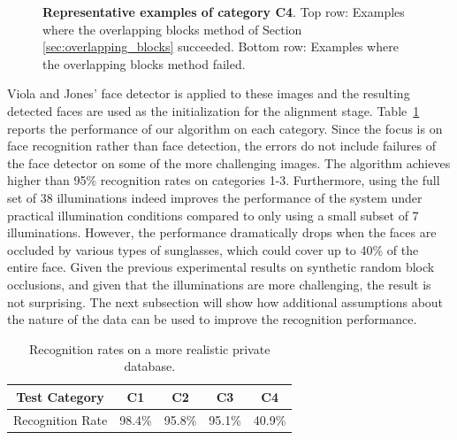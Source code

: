 \begin{figure}
\begin{tabular}{@{}c@{}c@{}c@{}c@{}c@{}c@{}}
\end{tabular}
\caption{\small{\bf Representative examples of category C4}. Top row: Examples
where the overlapping blocks method of Section \ref{sec:overlapping_blocks}
succeeded. Bottom row: Examples where the overlapping blocks method
failed.}
\label{fig:examples4} 
\end{figure}
Viola and Jones' face detector is applied to these images and
the resulting detected faces are used as the 
initialization for the alignment stage.
Table~\ref{tab:UIUC-recognition} reports the performance of our
algorithm on each category.
Since the focus is on face
recognition rather than face detection, 
the errors do not include failures of the face
detector on some of the more challenging images.
The algorithm achieves higher than 95\%
recognition rates on categories 1-3. Furthermore, using the
full set of 38 illuminations indeed improves the performance of
the system under practical illumination conditions compared to
only using a small subset of 7 illuminations. However, the
performance dramatically drops when the faces are occluded by
various types of sunglasses, which could cover up to 40\% of
the entire face. Given the previous experimental results on
synthetic random block occlusions, and given that the
illuminations are more challenging, the result is not
surprising. The next subsection will show how additional
assumptions about the nature of the data can be used to improve 
the recognition performance.
\begin{table}[h]
\centering \caption{Recognition rates on a more realistic
private database.}
\begin{tabular}{|c|c|c|c|c| }
\hline
Test Category & C1 & C2 & C3 & C4  \\
\hline
\hline
Recognition Rate & 98.4\% & 95.8\% & 95.1\% & 40.9\% \\
\hline
\end{tabular}
\label{tab:UIUC-recognition}
\end{table}

